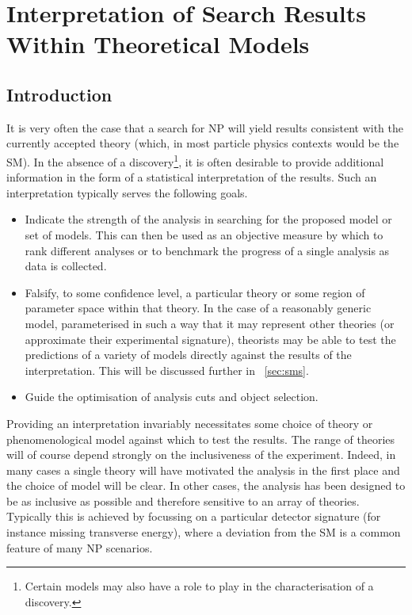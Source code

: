 \chapter{Interpretation of Search Results Within Theoretical Models}
\label{sec:interpretation}
\section{Introduction}
It is very often the case that a search for \ac{NP} will yield results
consistent with the currently accepted theory (which, in most particle physics
contexts would be the \ac{SM}). In the absence of a discovery\footnote{Certain
  models may also have a role to play in the characterisation of a discovery.},
it is often desirable to provide additional information in the form of a
statistical interpretation of the results. Such an interpretation typically
serves the following goals.
\begin{itemize}
\item Indicate the strength of the analysis in searching for the proposed model
  or set of models. This can then be used as an objective measure by which to
  rank different analyses or to benchmark the progress of a single analysis as
  data is collected.
\item Falsify, to some confidence level, a particular theory or some region of
  parameter space within that theory. In the case of a reasonably generic model,
  parameterised in such a way that it may represent other theories (or
  approximate their experimental signature), theorists may be able to
  test the predictions of a variety of models directly against the results of
  the interpretation. This will be discussed further in \sec~\ref{sec:sms}.
\item Guide the optimisation of analysis cuts and object selection.
\end{itemize}

Providing an interpretation invariably necessitates some choice of theory or
phenomenological model against which to test the results. The range of theories
will of course depend strongly on the inclusiveness of the experiment. Indeed,
in many cases a single theory will have motivated the analysis in the first
place and the choice of model will be clear. In other cases, the analysis has
been designed to be as inclusive as possible and therefore sensitive to an array
of theories. Typically this is achieved by focussing on a particular detector
signature (for instance missing transverse energy), where a deviation from the
\ac{SM} is a common feature of many \ac{NP} scenarios.

